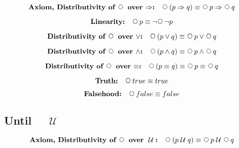 \documentclass[fleqn, leqno]{article}
\newcommand{\impl}{\ensuremath{\Rightarrow}}        %
\newcommand{\Until}{\;\mathcal{U}\;}
\newcommand{\Next}{\;\,\text{\raisebox{3.5pt}{\circle{6}}}}
\newcommand{\spacer}{\vspace{-30pt}}
\newcommand{\firstspacer}{\vspace{-26pt}}
\begin{document}
\firstspacer

\begin{equation}\label{E:distNextImp}
\textbf{Axiom, Distributivity of $\Next$ over $\impl$:}\quad \Next (p \impl q) \equiv \Next p \impl \Next q
\end{equation}

\spacer

\begin{equation}\label{E:linearity}
\textbf{Linearity:}\quad \Next p \equiv \neg\Next\neg p
\end{equation}

\spacer

\begin{equation}\label{E:distNextOr}
\textbf{Distributivity of $\Next$ over $\lor$:}\quad \Next (p \lor q) \equiv \Next p \lor \Next q
\end{equation}

\spacer

\begin{equation}\label{E:distNextAnd}
\textbf{Distributivity of $\Next$ over $\land$:}\quad \Next (p \land q) \equiv \Next p \land \Next q
\end{equation}

\spacer

\begin{equation}\label{E:distNextEquiv}
\textbf{Distributivity of $\Next$ over $\equiv$:}\quad \Next (p \equiv q) \equiv \Next p \equiv \Next q
\end{equation}

\spacer

\begin{equation}\label{E:nextTruth}
\textbf{Truth:}\quad \Next true \equiv true
\end{equation}

\spacer

\begin{equation}\label{E:nextFalse}
\textbf{Falsehood:}\quad \Next false \equiv false
\end{equation}

\subsection*{Until $\quad\Until$}

\begin{equation}\label{E:distNextUntil}
\textbf{Axiom, Distributivity of $\Next$ over $\Until$:}\quad \Next (p \Until q) \equiv \Next p \Until \Next q
\end{equation}
\end{document}
